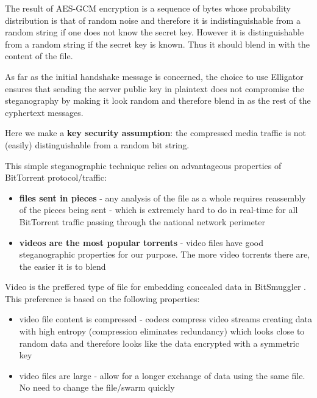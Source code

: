 \documentclass[11pt]{book} %
\newcommand{\projectName}{BitSmuggler }
\begin{document}
The result of AES-GCM encryption is a sequence of bytes whose probability distribution is that of random noise and therefore it is indistinguishable from a random string if one does not know the secret key. However it is distinguishable from a random string if the secret key is known. Thus it should blend in with the content of the file.

As far as the initial handshake message is concerned, the choice to use Elligator ensures that sending the server public key in plaintext does not compromise the steganography by making it look random and therefore blend in as the rest of the cyphertext messages.

Here we make a \textbf{key security assumption}: the compressed media traffic is not (easily) distinguishable from a random bit string. 

This simple steganographic technique relies on advantageous properties of BitTorrent protocol/traffic:
\begin{itemize}
\item \textbf{files sent in pieces} - any analysis of the file as a whole requires reassembly of the pieces being sent - which is extremely hard to do in real-time for all BitTorrent traffic passing through the national network perimeter
\item \textbf{videos are the most popular torrents} - video files have good steganographic properties for our purpose. The more video torrents there are, the easier it is to blend
\end{itemize}


Video is the preffered type of file for embedding concealed data in \projectName. This preference is based on the following properties:
\begin{itemize}
\item video file content is compressed - codecs compress video streams creating data with high entropy (compression eliminates redundancy) which looks close to random data and therefore looks like the data encrypted with a symmetric key
\item video files are large - allow for a longer exchange of data using the same file. No need to change the file/swarm quickly

\end{itemize}

\label{subsec:steganography}

\end{document}
